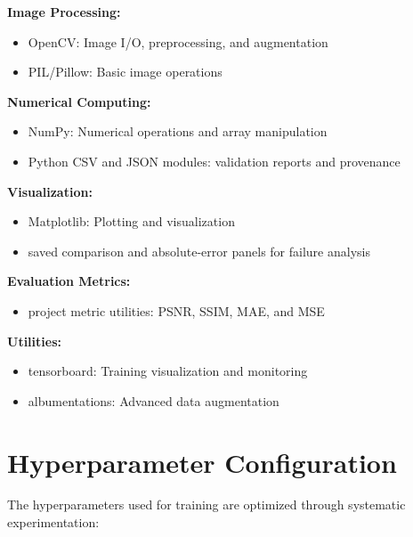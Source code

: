 \documentclass[12pt,a4paper]{report}
\begin{document}
\textbf{Image Processing:}
\begin{itemize}
    \item OpenCV: Image I/O, preprocessing, and augmentation
    \item PIL/Pillow: Basic image operations
\end{itemize}

\vspace{0.5cm}

\textbf{Numerical Computing:}
\begin{itemize}
    \item NumPy: Numerical operations and array manipulation
    \item Python CSV and JSON modules: validation reports and provenance
\end{itemize}

\vspace{0.5cm}

\textbf{Visualization:}
\begin{itemize}
    \item Matplotlib: Plotting and visualization
    \item saved comparison and absolute-error panels for failure analysis
\end{itemize}

\vspace{0.5cm}

\textbf{Evaluation Metrics:}
\begin{itemize}
    \item project metric utilities: PSNR, SSIM, MAE, and MSE
\end{itemize}

\vspace{0.5cm}

\textbf{Utilities:}
\begin{itemize}
    \item tensorboard: Training visualization and monitoring
    \item albumentations: Advanced data augmentation
\end{itemize}

\section{Hyperparameter Configuration}

The hyperparameters used for training are optimized through systematic experimentation:

\vspace{0.5cm}
\end{document}
